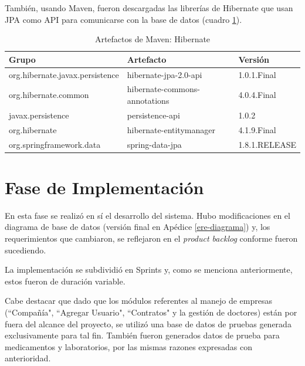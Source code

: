     También, usando Maven, fueron descargadas las librerías de Hibernate que usan JPA como API para comunicarse con la base de datos (cuadro \ref{artefactos-hibernate}).
    
    \begin{table}[h!]
        
        \begin{center}
            \begin{tabular}{|l|l|l|}\hline
                Grupo & Artefacto & Versión \\\hline
                org.hibernate.javax.persistence & hibernate-jpa-2.0-api & 1.0.1.Final \\\hline
                org.hibernate.common & hibernate-commons-annotations & 4.0.4.Final \\\hline
                javax.persistence & persistence-api & 1.0.2 \\\hline
                org.hibernate & hibernate-entitymanager & 4.1.9.Final \\\hline
                org.springframework.data & spring-data-jpa & 1.8.1.RELEASE \\\hline
            \end{tabular}
        \end{center}
        
        \caption{Artefactos de Maven: Hibernate}
        \label{artefactos-hibernate}
    \end{table}
    
\section{Fase de Implementación} 

En esta fase se realizó en sí el desarrollo del sistema. Hubo modificaciones en el diagrama de base de datos (versión final en Apédice \ref{ere-diagrama}) y, los requerimientos que cambiaron, se reflejaron en el \textit{product backlog} conforme fueron sucediendo.

La implementación se subdividió en Sprints y, como se menciona anteriormente, estos fueron de duración variable.

Cabe destacar que dado que los módulos referentes al manejo de empresas (``Compañía", ``Agregar Usuario", ``Contratos" y la gestión de doctores) están por fuera del alcance del proyecto, se utilizó una base de datos de pruebas generada exclusivamente para tal fin. También fueron generados datos de prueba para medicamentos y laboratorios, por las mismas razones expresadas con anterioridad.

